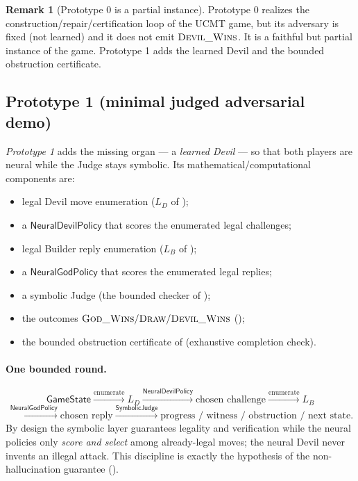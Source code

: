 \documentclass[11pt]{article}
\theoremstyle{definition}
\newtheorem{remark}{Remark}[section]
\theoremstyle{plain}
\begin{document}
\begin{remark}[Prototype 0 is a partial instance]\label{rem:proto0-scaffold}
Prototype 0 realizes the construction/repair/certification loop of the UCMT game,
but its adversary is fixed (not learned) and it does not emit $\textsc{Devil\_Wins}$.
It is a faithful but partial instance of the game.  Prototype 1 adds the
learned Devil and the bounded obstruction certificate.
\end{remark}

\subsection{Prototype 1 (minimal judged adversarial demo)}
\label{sec:proto1}

\emph{Prototype 1} adds the missing organ --- a \emph{learned Devil} --- so that both
players are neural while the Judge stays symbolic. Its mathematical/computational
components are:
\begin{itemize}[leftmargin=1.5em]
\item legal Devil move enumeration ($L_D$ of );
\item a $\mathsf{NeuralDevilPolicy}$ that scores the enumerated legal challenges;
\item legal Builder reply enumeration ($L_B$ of );
\item a $\mathsf{NeuralGodPolicy}$ that scores the enumerated legal replies;
\item a symbolic Judge (the bounded checker of );
\item the outcomes $\textsc{God\_Wins} / \textsc{Draw} / \textsc{Devil\_Wins}$ ();
\item the bounded obstruction certificate of  (exhaustive completion check).
\end{itemize}

\paragraph{One bounded round.}
\[
  \mathsf{GameState}
  \xrightarrow{\text{enumerate}} L_D
  \xrightarrow{\mathsf{NeuralDevilPolicy}} \text{chosen challenge}
  \xrightarrow{\text{enumerate}} L_B
\]
\[
  \xrightarrow{\mathsf{NeuralGodPolicy}} \text{chosen reply}
  \xrightarrow{\mathsf{SymbolicJudge}} \text{progress / witness / obstruction / next state}.
\]
By design the symbolic layer guarantees legality and verification while the neural
policies only \emph{score and select} among already-legal moves; the neural Devil
never invents an illegal attack. This discipline is exactly the hypothesis of the
non-hallucination guarantee ().
\end{document}
